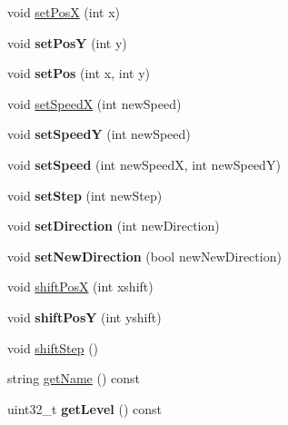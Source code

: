 \begin{DoxyCompactItemize}
\item 
void \hyperlink{class_creature_a574cab04b1cfe1a31140d27b7da2d160}{set\+Pos\+X} (int x)
\item 
\hypertarget{class_creature_a9b5076a5b4d59bc7c6cc8af730aad107}{}void {\bfseries set\+Pos\+Y} (int y)\label{class_creature_a9b5076a5b4d59bc7c6cc8af730aad107}

\item 
\hypertarget{class_creature_a754e06162a1a2e4d652d2d659522eb5e}{}void {\bfseries set\+Pos} (int x, int y)\label{class_creature_a754e06162a1a2e4d652d2d659522eb5e}

\item 
void \hyperlink{class_creature_aab754ef03dab3d015ce434f2eff959ad}{set\+Speed\+X} (int new\+Speed)
\item 
\hypertarget{class_creature_aac1a25f1474f8d692c72a0e04225e7e1}{}void {\bfseries set\+Speed\+Y} (int new\+Speed)\label{class_creature_aac1a25f1474f8d692c72a0e04225e7e1}

\item 
\hypertarget{class_creature_a5ea585e2dd583580fed3eea025442607}{}void {\bfseries set\+Speed} (int new\+Speed\+X, int new\+Speed\+Y)\label{class_creature_a5ea585e2dd583580fed3eea025442607}

\item 
\hypertarget{class_creature_aec233842e0c1bc6d6c778cd2924dc50d}{}void {\bfseries set\+Step} (int new\+Step)\label{class_creature_aec233842e0c1bc6d6c778cd2924dc50d}

\item 
\hypertarget{class_creature_a3d11de9ac9ff9182abd8f2bca69793cd}{}void {\bfseries set\+Direction} (int new\+Direction)\label{class_creature_a3d11de9ac9ff9182abd8f2bca69793cd}

\item 
\hypertarget{class_creature_a854e22f6082cae4189ed335a6bb046cf}{}void {\bfseries set\+New\+Direction} (bool new\+New\+Direction)\label{class_creature_a854e22f6082cae4189ed335a6bb046cf}

\item 
void \hyperlink{class_creature_aa7e3d6549d9f8f3686a01373051ed73c}{shift\+Pos\+X} (int xshift)
\item 
\hypertarget{class_creature_a5b2b7d3c22c5a3a1484fac2feb5cf8ad}{}void {\bfseries shift\+Pos\+Y} (int yshift)\label{class_creature_a5b2b7d3c22c5a3a1484fac2feb5cf8ad}

\item 
void \hyperlink{class_creature_af6d50bdceeef392057b2fab6b35721fc}{shift\+Step} ()
\item 
string \hyperlink{class_creature_a9fef1ee8fc4e5e4744b2fb7ccfac49ad}{get\+Name} () const 
\item 
\hypertarget{class_creature_a816573efe0e8dba60663ab8f1dc4050e}{}uint32\+\_\+t {\bfseries get\+Level} () const \label{class_creature_a816573efe0e8dba60663ab8f1dc4050e}


\end{DoxyCompactItemize}
